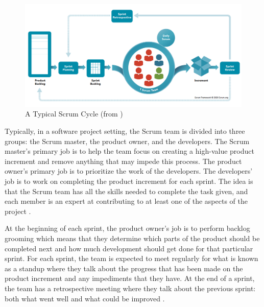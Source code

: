 \begin{figure}[h]
\centering
\includegraphics[width=.8\textwidth]{section03/assets/scrum-cycle.png}
\caption[Scrum Cycle Diagram]{\label{Scrum Diagram}A Typical Scrum Cycle (from \cite{scrumorg})}
\end{figure}

\vspace{\baselineskip}

Typically, in a software project setting, the Scrum team is divided 
into three groups: the Scrum master, the product owner, and the 
developers. The Scrum master’s primary job is to help the team focus 
on creating a high-value product increment and remove anything that 
may impede this process. The product owner’s primary job is to 
prioritize the work of the developers. The developers’ job is to 
work on completing the product increment for each sprint. The idea is 
that the Scrum team has all the skills needed to complete the task 
given, and each member is an expert at contributing to at least one of 
the aspects of the project \cite{scrumorg}. 

At the beginning of each sprint, the product owner’s job is to perform 
backlog grooming which means that they determine which parts of the 
product should be completed next and how much development should get 
done for that particular sprint. For each sprint, the team is expected 
to meet regularly for what is known as a standup where they talk about 
the progress that has been made on the product increment and any 
impediments that they have. At the end of a sprint, the team has a 
retrospective meeting where they talk about the previous sprint: both 
what went well and what could be improved \cite{scrumorg}. 

